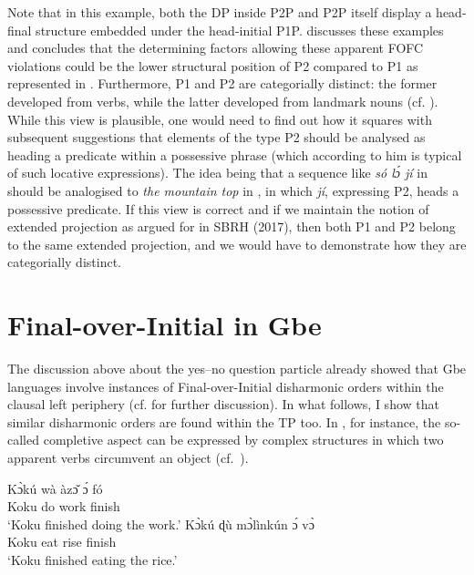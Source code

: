 \documentclass[output=paper]{langsci/langscibook}
\begin{document}
Note that in this example, both the DP inside P2P and P2P itself display a
head-final structure embedded under the head-initial P1P. \citet{Biberauer2016}
discusses these examples and concludes that the determining factors allowing
these apparent \gls{FOFC} violations could be the lower structural position of P2
compared to P1 as represented in . Furthermore, P1 and P2 are
categorially distinct: the former developed from verbs, while the latter
developed from landmark nouns (cf. \citealt{Aboh2010c}). While this view is
plausible, one would need to find out how it squares with 
subsequent suggestions that elements of the type P2 should be analysed as
heading a predicate within a possessive phrase (which according to him is
typical of such locative expressions).  The idea being that a sequence like
\emph{só l\'ɔ jí} in  should be analogised to \emph{the mountain
top} in , in which \emph{jí}, expressing P2, heads a possessive
predicate. If this view is correct and if we maintain the notion of extended
projection as argued for in SBRH (2017), then both P1 and P2 belong to the same
extended projection, and we would have to demonstrate how they are categorially
distinct.

\section{Final-over-Initial in Gbe}\largerpage

The discussion above about the yes--no question particle already showed that Gbe
languages involve instances of Final-over-Initial disharmonic orders within the
clausal left periphery (cf. \citealt{Aboh2016a} for further discussion). In
what follows, I show that similar disharmonic orders are found within the TP
too. In , for instance, the so-called completive aspect can be expressed
by complex structures in which two apparent verbs circumvent an object
(cf.~\citealt{DaCruz1995,Aboh2009,VandenBergAboh2013}).

\ea\label{ex:aboh:14.7}  \parencite[363]{DaCruz1995}
    \ea\label{ex:aboh:14.7a}
        \gll    K\`ɔkú wà àz\v{ɔ} \'ɔ fó \\
                Koku do work \Det{} finish\\
        \glt    \enquote*{Koku finished doing the work.}
    \ex\label{ex:aboh:14.7b}
        \gll    K\`ɔkú ɖù m\`ɔlìnkún \'ɔ v\`ɔ \\
                Koku eat rise \Det{} finish\\
        \glt    \enquote*{Koku finished eating the rice.}
    \z
\z
\end{document}
